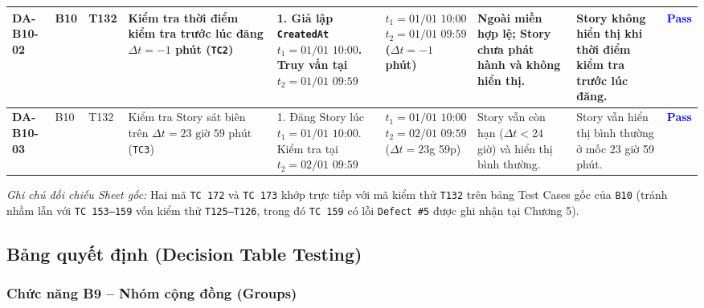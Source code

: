 \documentclass[11pt,a4paper]{article}
\begin{document}
\begin{longtable}{|C{0.95cm}|C{0.75cm}|C{0.95cm}|L{2.0cm}|L{2.95cm}|L{2.15cm}|L{2.6cm}|L{2.45cm}|C{0.85cm}|}
\textbf{DA-B10-02} & B10 & T132 & Kiểm tra thời điểm kiểm tra trước lúc đăng $\Delta t = -1$ phút (\texttt{TC2}) & 1. Giả lập \texttt{CreatedAt} $t_1 = \text{01/01 10:00}$. Truy vấn tại $t_2 = \text{01/01 09:59}$ & $t_1 = \text{01/01 10:00}$\newline $t_2 = \text{01/01 09:59}$ ($\Delta t = -1$ phút) & Ngoài miền hợp lệ; Story chưa phát hành và không hiển thị. & Story không hiển thị khi thời điểm kiểm tra trước lúc đăng. & \textcolor{blue}{\textbf{Pass}} \\ \hline
\textbf{DA-B10-03} & B10 & T132 & Kiểm tra Story sát biên trên $\Delta t = 23\text{ giờ }59\text{ phút}$ (\texttt{TC3}) & 1. Đăng Story lúc $t_1 = \text{01/01 10:00}$. Kiểm tra tại $t_2 = \text{02/01 09:59}$ & $t_1 = \text{01/01 10:00}$\newline $t_2 = \text{02/01 09:59}$ ($\Delta t = 23$g 59p) & Story vẫn còn hạn ($\Delta t < 24$ giờ) và hiển thị bình thường. & Story vẫn hiển thị bình thường ở mốc 23 giờ 59 phút. & \textcolor{blue}{\textbf{Pass}} \\ \hline
\end{longtable}
\endgroup

\noindent\textit{Ghi chú đối chiếu Sheet gốc:} Hai mã \texttt{TC 172} và \texttt{TC 173} khớp trực tiếp với mã kiểm thử \texttt{T132} trên bảng Test Cases gốc của \texttt{B10} (tránh nhầm lẫn với \texttt{TC 153--159} vốn kiểm thử \texttt{T125--T126}, trong đó \texttt{TC 159} có lỗi \texttt{Defect \#5} được ghi nhận tại Chương 5).


\subsection{Bảng quyết định (Decision Table Testing)}

\subsubsection{Chức năng B9 -- Nhóm cộng đồng (Groups)}
\end{document}
